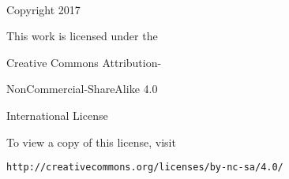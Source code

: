\doublespaced

\vspace*{\fill}

\thetitle \\

\textcopyright \hspace{10pt} Copyright 2017

\theauthor

This work is licensed under the

Creative Commons Attribution-

NonCommercial-ShareAlike 4.0

International License

To view a copy of this license, visit

{\tt http://creativecommons.org/licenses/by-nc-sa/4.0/}
\thispagestyle{empty}
